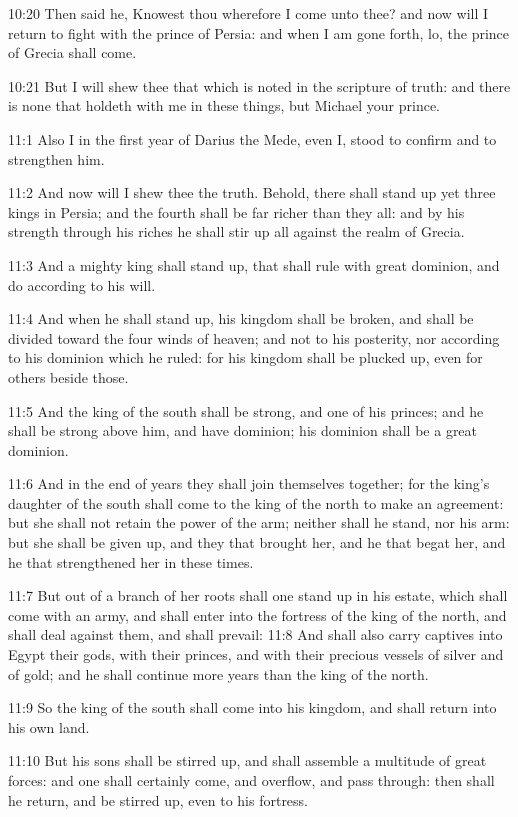 10:20 Then said he, Knowest thou wherefore I come unto thee? and now
will I return to fight with the prince of Persia: and when I am gone
forth, lo, the prince of Grecia shall come.

10:21 But I will shew thee that which is noted in the scripture of
truth: and there is none that holdeth with me in these things, but
Michael your prince.

11:1 Also I in the first year of Darius the Mede, even I, stood to
confirm and to strengthen him.

11:2 And now will I shew thee the truth. Behold, there shall stand up
yet three kings in Persia; and the fourth shall be far richer than
they all: and by his strength through his riches he shall stir up all
against the realm of Grecia.

11:3 And a mighty king shall stand up, that shall rule with great
dominion, and do according to his will.

11:4 And when he shall stand up, his kingdom shall be broken, and
shall be divided toward the four winds of heaven; and not to his
posterity, nor according to his dominion which he ruled: for his
kingdom shall be plucked up, even for others beside those.

11:5 And the king of the south shall be strong, and one of his
princes; and he shall be strong above him, and have dominion; his
dominion shall be a great dominion.

11:6 And in the end of years they shall join themselves together; for
the king's daughter of the south shall come to the king of the north
to make an agreement: but she shall not retain the power of the arm;
neither shall he stand, nor his arm: but she shall be given up, and
they that brought her, and he that begat her, and he that strengthened
her in these times.

11:7 But out of a branch of her roots shall one stand up in his
estate, which shall come with an army, and shall enter into the
fortress of the king of the north, and shall deal against them, and
shall prevail: 11:8 And shall also carry captives into Egypt their
gods, with their princes, and with their precious vessels of silver
and of gold; and he shall continue more years than the king of the
north.

11:9 So the king of the south shall come into his kingdom, and shall
return into his own land.

11:10 But his sons shall be stirred up, and shall assemble a multitude
of great forces: and one shall certainly come, and overflow, and pass
through: then shall he return, and be stirred up, even to his
fortress.


